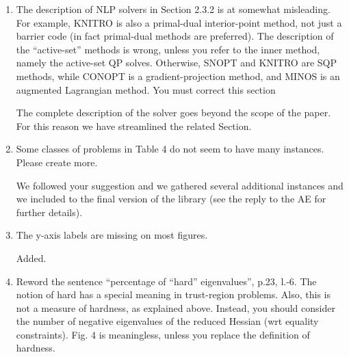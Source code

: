 \documentclass[11pt]{article}
\newcommand{\rep}[1]{{\textcolor{acblue}{#1}}}
\newcommand{\leo}[1]{{\color{red}#1}}
\begin{document}
{\begin{enumerate}
\rep{We added a comment about this issue in Section 2.1 
}


\item The description of NLP solvers in Section 2.3.2 is at somewhat misleading. For example, KNITRO is also a primal-dual interior-point method, not just a barrier code (in fact primal-dual
methods are preferred). The description of the “active-set” methods is wrong, unless you refer
to the inner method, namely the active-set QP solves. Otherwise, SNOPT and KNITRO are
SQP methods, while CONOPT is a gradient-projection method, and MINOS is an augmented
Lagrangian method. You must correct this section

\rep{The complete description of the solver goes beyond the scope of the paper. For this reason we have streamlined the related Section.
}


\item Some classes of problems in Table 4 do not seem to have many instances. Please create more.

\rep{We followed your suggestion and we gathered several additional instances and we included to the final version of the library (see the reply to the AE for further details).}

\item The y-axis labels are missing on most figures.

\rep{
Added.
}


\item Reword the sentence ``percentage of ``hard'' eigenvalues'', p.23, l.-6. The notion of hard has a
special meaning in trust-region problems. Also, this is not a measure of hardness, as explained
above. Instead, you should consider the number of negative eigenvalues of the reduced Hessian
(wrt equality constraints). Fig. 4 is meaningless, unless you replace the definition of hardness.


\end{enumerate}}
\end{document}
